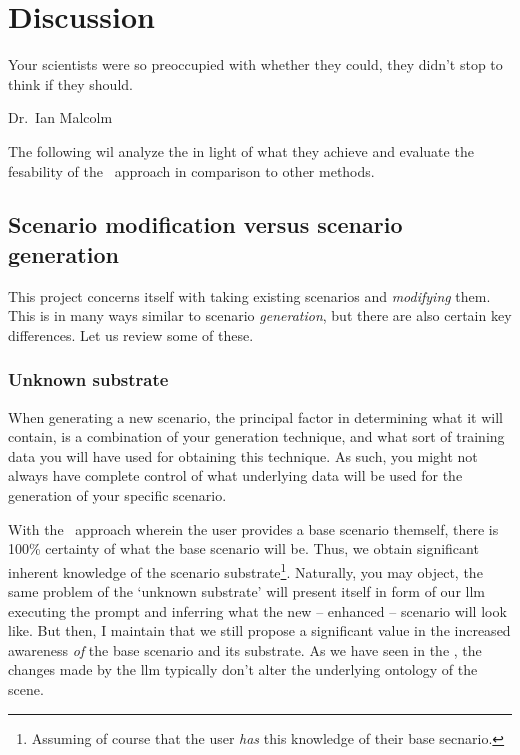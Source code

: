 \chapter{Discussion}\label{chp:discussion}

\epigraph{Your scientists were so preoccupied with whether they could, they didn't stop to think if they should.}{Dr.~Ian Malcolm}

The following wil analyze the  in light of what they achieve and evaluate the
fesability of the \hefe~approach in comparison to other methods.

\section{Scenario modification versus scenario generation}

This project concerns itself with taking existing scenarios and \emph{modifying} them. This is in
many ways similar to scenario \emph{generation}, but there are also certain key differences. Let us
review some of these.

\subsection{Unknown substrate}

When generating a new scenario, the principal factor in determining what it will contain, is a
combination of your generation technique, and what sort of training data you will have used for
obtaining this technique. As such, you might not always have complete control of what underlying
data will be used for the generation of your specific scenario.

With the \hefe~approach wherein the user provides a base scenario themself, there is \num{100}\%
certainty of what the base scenario will be. Thus, we obtain significant inherent knowledge of the
scenario substrate\footnote{Assuming of course that the user \emph{has} this knowledge of their base
    secnario.}. Naturally, you may object, the same problem of the `unknown substrate' will present
itself in form of our \acrshort{llm} executing the prompt and inferring what the new -- enhanced --
scenario will look like. But then, I maintain that we still propose a significant value in the
increased awareness \emph{of} the base scenario and its substrate. As we have seen in the
, the changes made by the \acrshort{llm} typically don't alter the underlying
ontology of the scene.

